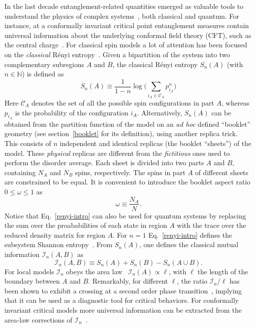 \documentclass[twocolumn,superscriptaddress,prb,10pt]{revtex4-1}
\begin{document}
In the last decade entanglement-related quantities emerged as valuable tools to 
understand the physics of complex systems~\cite{amico-2008,eisert-2009,calabrese-2009,
cc-rev}, both classical and quantum. For instance, at a conformally invariant critical 
point entanglement measures contain universal information about the underlying 
conformal field theory (CFT), such as the central charge~\cite{holzhey-1994,vidal-2003,
calabrese-2004,calabrese-2012}. For classical spin models a lot of attention has been 
focused on the \emph{classical} R\'enyi entropy~\cite{jaconis-2013,stephan-2014}. Given 
a bipartition of the system into two complementary subregions $A$ and $B$, the classical 
R\'enyi entropy $S_n(A)$ (with $n\in\mathbb{N}$) is defined as 
%
\begin{equation}
S_n(A)\equiv \frac{1}{1-n}\log\Big(\sum\limits_{i_A\in{\mathcal C}_A} p^n_{i_A}
\Big)
\label{renyi-intro}
\end{equation}
%
Here ${\mathcal C}_A$ denotes the set of all the possible spin configurations in part 
$A$, whereas $p_{i_A}$ is the probability of the configuration $i_A$. 
Alternatively, $S_n(A)$ can be obtained from the partition function of the model on 
an \emph{ad hoc} defined ``booklet'' geometry (see section~\ref{booklet} for its 
definition), using another replica trick. This consists of $n$ independent and identical replicas (the 
booklet ``sheets'') of the model. These \emph{physical} replicas are different 
from the \emph{fictitious} ones used to perform the disorder average. Each sheet is 
divided into two parts $A$ and $B$, containing $N_A$ and $N_B$ spins, respectively. 
The spins in part $A$ of different sheets are constrained to be equal. It is 
convenient to introduce the booklet aspect ratio $0\le\omega\le1$ as  
%
\begin{equation}
\label{a-ratio}
\omega\equiv \frac{N_A}{N}.
\end{equation}
%
Notice that Eq.~\eqref{renyi-intro} can also be used for quantum systems by replacing 
the sum over the proababilities of each state in region $A$ with the trace over the reduced 
density matrix for region $A$. For $n=1$ 
Eq.~\eqref{renyi-intro} defines the subsystem Shannon entropy~\cite{alcaraz-2013,
stephan-2014-a}. From $S_n(A)$, one defines the classical mutual information 
${\mathcal I}_n(A,B)$ as 
%
\begin{equation}
{\mathcal I}_n(A,B)\equiv S_n(A)+S_n(B)-S_n(A\cup B). 
\end{equation}
%
For local models ${\mathcal I}_n$ obeys the area law~\cite{wolf-2008} ${\mathcal I}_n(A)
\propto\ell$, with $\ell$ the length of the boundary between $A$ and $B$. Remarkably, 
for different $\ell$, the ratio ${\mathcal I}_n/\ell$ has been shown to exhibit a crossing at a second 
order phase transition~\cite{jaconis-2013}, implying that it can be used as a diagnostic 
tool for critical behaviors. For conformally invariant critical models more universal 
information can be extracted from the area-law corrections of ${\mathcal I}_n$~\cite{stephan-2014}. 
\end{document}
